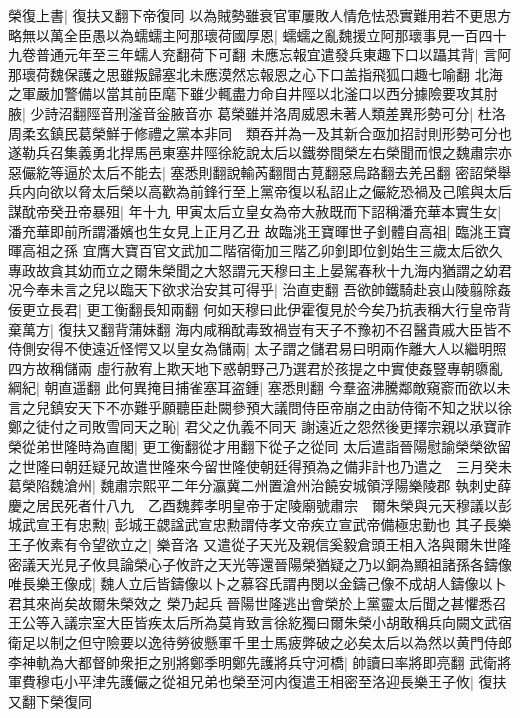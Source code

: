 榮復上書|{
	復扶又翻下帝復同}
以為賊勢雖衰官軍屢敗人情危怯恐實難用若不更思方略無以萬全臣愚以為蠕蠕主阿那瓌荷國厚恩|{
	蠕蠕之亂魏援立阿那瓌事見一百四十九卷普通元年至三年蠕人兖翻荷下可翻}
未應忘報宜遣發兵東趣下口以躡其背|{
	言阿那瓌荷魏保護之思雖叛歸塞北未應漠然忘報恩之心下口盖指飛狐口趣七喻翻}
北海之軍嚴加警備以當其前臣麾下雖少輒盡力命自井陘以北滏口以西分據險要攻其肘腋|{
	少詩沼翻陘音刑滏音釡腋音亦}
葛榮雖并洛周威恩未著人類差異形勢可分|{
	杜洛周柔玄鎮民葛榮鮮于修禮之黨本非同　類吞并為一及其新合亟加招討則形勢可分也}
遂勒兵召集義勇北捍馬邑東塞井陘徐紇說太后以鐵劵間榮左右榮聞而恨之魏肅宗亦惡儼紇等逼於太后不能去|{
	塞悉則翻說輸芮翻間古莧翻惡烏路翻去羌呂翻}
密詔榮舉兵内向欲以脅太后榮以高歡為前鋒行至上黨帝復以私詔止之儼紇恐禍及己隂與太后謀酖帝癸丑帝暴殂|{
	年十九}
甲寅太后立皇女為帝大赦既而下詔稱潘充華本實生女|{
	潘充華即前所謂潘嬪也生女見上正月乙丑}
故臨洮王寶暉世子釗體自高祖|{
	臨洮王寶暉高祖之孫}
宜膺大寶百官文武加二階宿衛加三階乙卯釗即位釗始生三歲太后欲久專政故貪其幼而立之爾朱榮聞之大怒謂元天穆曰主上晏駕春秋十九海内猶謂之幼君况今奉未言之兒以臨天下欲求治安其可得乎|{
	治直吏翻}
吾欲帥鐵騎赴哀山陵翦除姦佞更立長君|{
	更工衡翻長知兩翻}
何如天穆曰此伊霍復見於今矣乃抗表稱大行皇帝背棄萬方|{
	復扶又翻背蒲妹翻}
海内咸稱酖毒致禍豈有天子不豫初不召醫貴戚大臣皆不侍側安得不使遠近怪愕又以皇女為儲兩|{
	太子謂之儲君易曰明兩作離大人以繼明照四方故稱儲兩}
虛行赦宥上欺天地下惑朝野己乃選君於孩提之中實使姦豎專朝隳亂綱紀|{
	朝直遥翻}
此何異掩目捕雀塞耳盗鍾|{
	塞悉則翻}
今羣盗沸騰鄰敵窺窬而欲以未言之兒鎮安天下不亦難乎願聽臣赴闕參預大議問侍臣帝崩之由訪侍衛不知之狀以徐鄭之徒付之司敗雪同天之恥|{
	君父之仇義不同天}
謝遠近之怨然後更擇宗親以承寶祚榮從弟世隆時為直閣|{
	更工衡翻從才用翻下從子之從同}
太后遣詣晉陽慰諭榮榮欲留之世隆曰朝廷疑兄故遣世隆來今留世隆使朝廷得預為之備非計也乃遣之　三月癸未葛榮陷魏滄州|{
	魏肅宗熙平二年分瀛冀二州置滄州治饒安城領浮陽樂陵郡}
執刺史薛慶之居民死者什八九　乙酉魏葬孝明皇帝于定陵廟號肅宗　爾朱榮與元天穆議以彭城武宣王有忠勲|{
	彭城王勰諡武宣忠勲謂侍孝文帝疾立宣武帝備極忠勤也}
其子長樂王子攸素有令望欲立之|{
	樂音洛}
又遣從子天光及親信奚毅倉頭王相入洛與爾朱世隆密議天光見子攸具論榮心子攸許之天光等還晉陽榮猶疑之乃以銅為顯祖諸孫各鑄像唯長樂王像成|{
	魏人立后皆鑄像以卜之慕容氏謂冉閔以金鑄己像不成胡人鑄像以卜君其來尚矣故爾朱榮效之}
榮乃起兵晉陽世隆逃出會榮於上黨靈太后聞之甚懼悉召王公等入議宗室大臣皆疾太后所為莫肯致言徐紇獨曰爾朱榮小胡敢稱兵向闕文武宿衛足以制之但守險要以逸待勞彼懸軍千里士馬疲弊破之必矣太后以為然以黄門侍郎李神軌為大都督帥衆拒之别將鄭季明鄭先護將兵守河橋|{
	帥讀曰率將即亮翻}
武衛將軍費穆屯小平津先護儼之從祖兄弟也榮至河内復遣王相密至洛迎長樂王子攸|{
	復扶又翻下榮復同}
